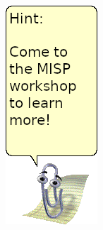 \begin{frame}
\begin{minipage}{0.19\textwidth}
        \includegraphics[width=0.8\linewidth]{pictures/clippy-hint.png}
    \end{minipage}
\end{frame}


